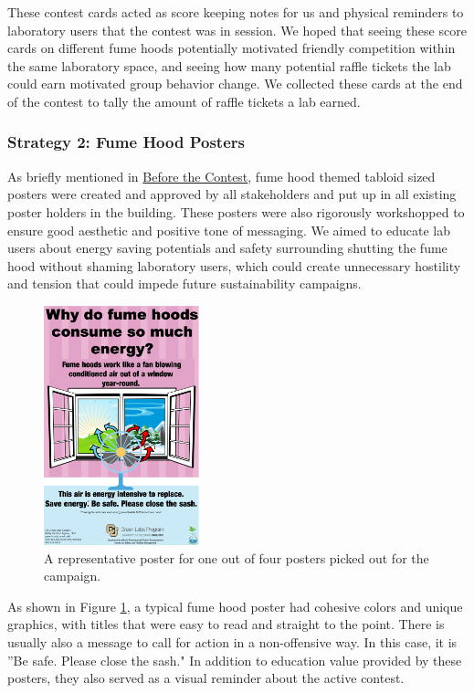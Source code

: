 \documentclass[12pt, twocolumn]{article}
\begin{document}
These contest cards acted as score keeping notes for us and physical reminders to laboratory users that the contest was in session. We hoped that seeing these score cards on different fume hoods potentially motivated friendly competition within the same laboratory space, and seeing how many potential raffle tickets the lab could earn motivated group behavior change. We collected these cards at the end of the contest to tally the amount of raffle tickets a lab earned.

\subsubsection*{Strategy 2: Fume Hood Posters}\label{Sec:Strategy2}
As briefly mentioned in \hyperref[Sec:BeforeContest]{Before the Contest}, fume hood themed tabloid sized posters were created and approved by all stakeholders and put up in all existing poster holders in the building. These posters were also rigorously workshopped to ensure good aesthetic and positive tone of messaging. We aimed to educate lab users about energy saving potentials and safety surrounding shutting the fume hood without shaming laboratory users, which could create unnecessary hostility and tension that could impede future sustainability campaigns.  
\begin{figure}[ht]	
	\centering
	\includegraphics[width=0.4\textwidth]{Images/Contest_FumeHoodFanPoster.png}
	\caption{A representative poster for one out of four posters picked out for the campaign. }
	\label{Fig:FumeHoodFan}
\end{figure}

As shown in Figure \ref{Fig:FumeHoodFan}, a typical fume hood poster had cohesive colors and unique graphics, with titles that were easy to read and straight to the point. There is usually also a message to call for action in a non-offensive way. In this case, it is ''Be safe. Please close the sash." In addition to education value provided by these posters, they also served as a visual reminder about the active contest. 
\end{document}
